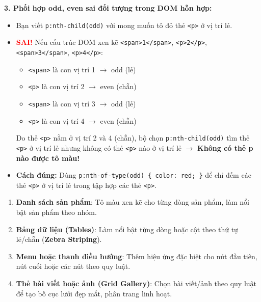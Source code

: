 \documentclass[11pt,oneside]{book}
\newcommand{\codeinline}[1]{\textcolor{accentOrange}{\texttt{#1}}}
\newcommand{\term}[1]{\textbf{\textcolor{primaryBlue}{#1}}}
\begin{document}
\begin{warnBox}
\par\vspace{5pt}
\textbf{3. Phối hợp odd, even sai đối tượng trong DOM hỗn hợp:}
\begin{itemize}[leftmargin=1.5em, itemsep=2pt, parsep=0pt]
    \item Bạn viết \codeinline{p:nth-child(odd)} với mong muốn tô đỏ thẻ \codeinline{<p>} ở vị trí lẻ.
    \item \textcolor{red}{\textbf{SAI!}} Nếu cấu trúc DOM xen kẽ \codeinline{<span>1</span>}, \codeinline{<p>2</p>}, \codeinline{<span>3</span>}, \codeinline{<p>4</p>}:
    \begin{itemize}[leftmargin=1em]
        \item \codeinline{<span>} là con vị trí 1 $\rightarrow$ odd (lẻ)
        \item \codeinline{<p>} là con vị trí 2 $\rightarrow$ even (chẵn)
        \item \codeinline{<span>} là con vị trí 3 $\rightarrow$ odd (lẻ)
        \item \codeinline{<p>} là con vị trí 4 $\rightarrow$ even (chẵn)
    \end{itemize}
    Do thẻ \codeinline{<p>} nằm ở vị trí 2 và 4 (chẵn), bộ chọn \codeinline{p:nth-child(odd)} tìm thẻ \codeinline{<p>} ở vị trí lẻ nhưng không có thẻ \codeinline{<p>} nào ở vị trí lẻ $\rightarrow$ \textbf{Không có thẻ p nào được tô màu!}
    \item \textbf{Cách đúng:} Dùng \codeinline{p:nth-of-type(odd) \{ color: red; \}} để chỉ đếm các thẻ \codeinline{<p>} ở vị trí lẻ trong tập hợp các thẻ \codeinline{<p>}.
\end{itemize}
\end{warnBox}

\begin{conceptBox}
\begin{enumerate}[leftmargin=1.5em, itemsep=3pt, parsep=0pt]
    \item \textbf{Danh sách sản phẩm}: Tô màu xen kẽ cho từng dòng sản phẩm, làm nổi bật sản phẩm theo nhóm.
    \item \textbf{Bảng dữ liệu (Tables)}: Làm nổi bật từng dòng hoặc cột theo thứ tự lẻ/chẵn (\term{Zebra Striping}).
    \item \textbf{Menu hoặc thanh điều hướng}: Thêm hiệu ứng đặc biệt cho nút đầu tiên, nút cuối hoặc các nút theo quy luật.
    \item \textbf{Thẻ bài viết hoặc ảnh (Grid Gallery)}: Chọn bài viết/ảnh theo quy luật để tạo bố cục lưới đẹp mắt, phân trang linh hoạt.
\end{enumerate}
\end{conceptBox}
\end{document}
